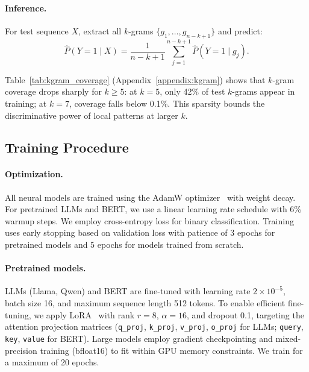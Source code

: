 \paragraph{Inference.} For test sequence $X$, extract all $k$-grams $\{g_1, \ldots, g_{n-k+1}\}$ and predict:
\begin{equation}
\hat{P}(Y=1 \mid X) = \frac{1}{n-k+1} \sum_{j=1}^{n-k+1} \hat{P}(Y=1 \mid g_j).
\end{equation}

Table~\ref{tab:kgram_coverage} (Appendix~\ref{appendix:kgram}) shows that $k$-gram coverage drops sharply for $k \geq 5$: at $k=5$, only 42\% of test $k$-grams appear in training; at $k=7$, coverage falls below 0.1\%. This sparsity bounds the discriminative power of local patterns at larger $k$.

\subsection{Training Procedure}
\label{subsec:training}

\paragraph{Optimization.}
All neural models are trained using the AdamW optimizer~\citep{loshchilov2019adamw} with weight decay. For pretrained LLMs and BERT, we use a linear learning rate schedule with 6\% warmup steps. We employ cross-entropy loss for binary classification. Training uses early stopping based on validation loss with patience of 3 epochs for pretrained models and 5 epochs for models trained from scratch.

\paragraph{Pretrained models.}
LLMs (Llama, Qwen) and BERT are fine-tuned with learning rate $2 \times 10^{-5}$, batch size 16, and maximum sequence length 512 tokens. To enable efficient fine-tuning, we apply LoRA~\citep{hu2022lora} with rank $r=8$, $\alpha=16$, and dropout 0.1, targeting the attention projection matrices (\texttt{q\_proj}, \texttt{k\_proj}, \texttt{v\_proj}, \texttt{o\_proj} for LLMs; \texttt{query}, \texttt{key}, \texttt{value} for BERT). Large models employ gradient checkpointing and mixed-precision training (bfloat16) to fit within GPU memory constraints. We train for a maximum of 20 epochs.


